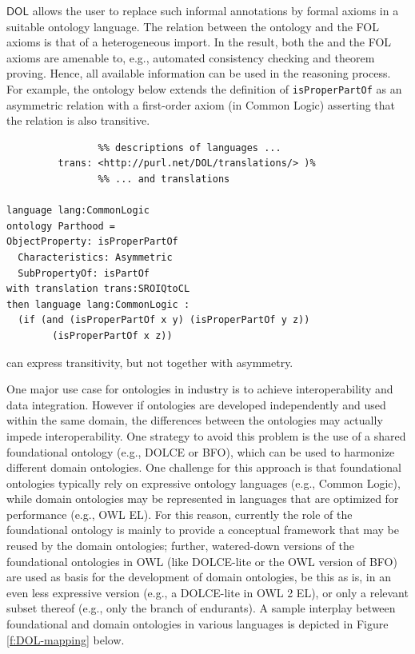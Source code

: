 \documentclass[10pt, a4paper]{isov2}
\newcommand*{\DOL}{\ensuremath{\mathsf{DOL}}\xspace}
\begin{document}
\DOL allows the user to replace such informal annotations by formal axioms in a suitable ontology 
language. The relation between the \OWL ontology and the FOL axioms is that of a heterogeneous 
import. In the result, both the \OWL and the FOL axioms are amenable to, e.g., automated consistency 
checking and theorem proving. Hence, all available information can be used in the reasoning process.
For example, the ontology below extends the \OWL definition of \texttt{isProperPartOf} as an asymmetric relation
with a first-order axiom (in Common Logic) asserting that the relation is also transitive.
\begin{lstlisting}[basicstyle=\small\ttfamily,language=dolText,alsolanguage=clif,alsolanguage=owl2Manchester,escapechar=@,mathescape]
%prefix( lang:  <http://purl.net/DOL/languages/>
                %% descriptions of languages ...
         trans: <http://purl.net/DOL/translations/> )%
                %% ... and translations

language lang:CommonLogic
ontology Parthood =
ObjectProperty: isProperPartOf  
  Characteristics: Asymmetric  
  SubPropertyOf: isPartOf 
with translation trans:SROIQtoCL
then language lang:CommonLogic :
  (if (and (isProperPartOf x y) (isProperPartOf y z)) 
        (isProperPartOf x z))
\end{lstlisting}
\OWL can express transitivity, but not together with asymmetry.



\label{onto-2}
One major use case for ontologies in industry is to achieve interoperability and data integration. 
However if ontologies are developed independently and used  within the same domain, the 
differences between the ontologies may actually impede interoperability. One strategy to avoid this 
problem is the use of a shared  foundational ontology (e.g., DOLCE or BFO), which can be used to 
harmonize different domain ontologies. One challenge for this approach is that foundational 
ontologies typically rely on expressive ontology languages (e.g., Common Logic), while domain 
ontologies may be represented in languages that are optimized for performance (e.g., OWL EL). For 
this reason, currently the role of the foundational ontology is mainly to provide a conceptual 
framework that may be reused by the  domain ontologies; further, watered-down versions of the 
foundational ontologies in OWL (like DOLCE-lite or the OWL version of BFO) are used as basis for 
the  development of domain ontologies, be this as is, in an even less expressive version (e.g., a 
DOLCE-lite in OWL 2 EL), or only a relevant subset thereof (e.g., only the branch of endurants). A 
sample interplay between  foundational and domain ontologies in various 
languages is depicted in Figure \ref{f:DOL-mapping} below.
\end{document}
